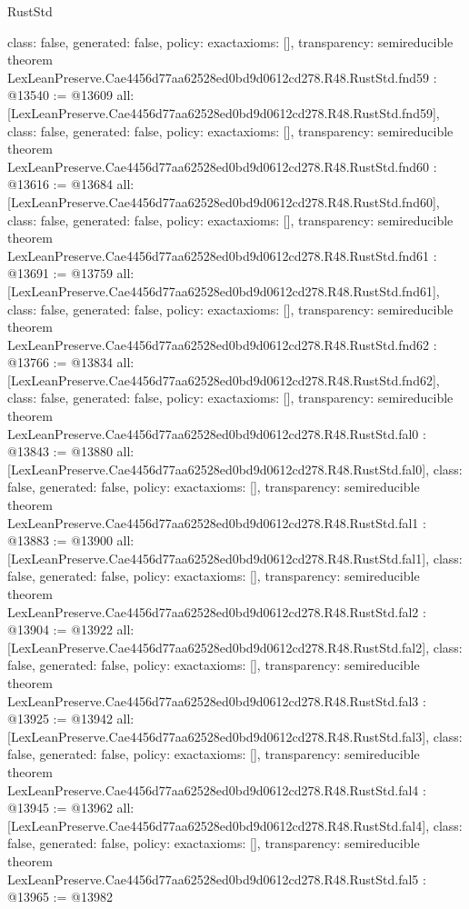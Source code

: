 \begin{lexlean}{RustStd}
\begin{coremodule}
{  class: false,
  generated: false,
  policy: exact{axioms: []},
  transparency: semireducible
}
theorem LexLeanPreserve.Cae4456d77aa62528ed0bd9d0612cd278.R48.RustStd.fnd59 : @13540 := @13609 {
  all: [LexLeanPreserve.Cae4456d77aa62528ed0bd9d0612cd278.R48.RustStd.fnd59],
  class: false,
  generated: false,
  policy: exact{axioms: []},
  transparency: semireducible
}
theorem LexLeanPreserve.Cae4456d77aa62528ed0bd9d0612cd278.R48.RustStd.fnd60 : @13616 := @13684 {
  all: [LexLeanPreserve.Cae4456d77aa62528ed0bd9d0612cd278.R48.RustStd.fnd60],
  class: false,
  generated: false,
  policy: exact{axioms: []},
  transparency: semireducible
}
theorem LexLeanPreserve.Cae4456d77aa62528ed0bd9d0612cd278.R48.RustStd.fnd61 : @13691 := @13759 {
  all: [LexLeanPreserve.Cae4456d77aa62528ed0bd9d0612cd278.R48.RustStd.fnd61],
  class: false,
  generated: false,
  policy: exact{axioms: []},
  transparency: semireducible
}
theorem LexLeanPreserve.Cae4456d77aa62528ed0bd9d0612cd278.R48.RustStd.fnd62 : @13766 := @13834 {
  all: [LexLeanPreserve.Cae4456d77aa62528ed0bd9d0612cd278.R48.RustStd.fnd62],
  class: false,
  generated: false,
  policy: exact{axioms: []},
  transparency: semireducible
}
theorem LexLeanPreserve.Cae4456d77aa62528ed0bd9d0612cd278.R48.RustStd.fal0 : @13843 := @13880 {
  all: [LexLeanPreserve.Cae4456d77aa62528ed0bd9d0612cd278.R48.RustStd.fal0],
  class: false,
  generated: false,
  policy: exact{axioms: []},
  transparency: semireducible
}
theorem LexLeanPreserve.Cae4456d77aa62528ed0bd9d0612cd278.R48.RustStd.fal1 : @13883 := @13900 {
  all: [LexLeanPreserve.Cae4456d77aa62528ed0bd9d0612cd278.R48.RustStd.fal1],
  class: false,
  generated: false,
  policy: exact{axioms: []},
  transparency: semireducible
}
theorem LexLeanPreserve.Cae4456d77aa62528ed0bd9d0612cd278.R48.RustStd.fal2 : @13904 := @13922 {
  all: [LexLeanPreserve.Cae4456d77aa62528ed0bd9d0612cd278.R48.RustStd.fal2],
  class: false,
  generated: false,
  policy: exact{axioms: []},
  transparency: semireducible
}
theorem LexLeanPreserve.Cae4456d77aa62528ed0bd9d0612cd278.R48.RustStd.fal3 : @13925 := @13942 {
  all: [LexLeanPreserve.Cae4456d77aa62528ed0bd9d0612cd278.R48.RustStd.fal3],
  class: false,
  generated: false,
  policy: exact{axioms: []},
  transparency: semireducible
}
theorem LexLeanPreserve.Cae4456d77aa62528ed0bd9d0612cd278.R48.RustStd.fal4 : @13945 := @13962 {
  all: [LexLeanPreserve.Cae4456d77aa62528ed0bd9d0612cd278.R48.RustStd.fal4],
  class: false,
  generated: false,
  policy: exact{axioms: []},
  transparency: semireducible
}
theorem LexLeanPreserve.Cae4456d77aa62528ed0bd9d0612cd278.R48.RustStd.fal5 : @13965 := @13982 {
}
\end{coremodule}
\end{lexlean}
